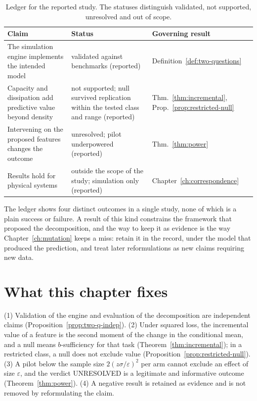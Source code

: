 \begin{table}[ht]
\centering
\small
\begin{tabular}{@{}p{4.1cm}p{4.0cm}p{4.0cm}@{}}
\toprule
Claim & Status & Governing result\\
\midrule
The simulation engine implements the intended model & validated against benchmarks (reported) & Definition~\ref{def:two-questions}\\
Capacity and dissipation add predictive value beyond density & not supported; null survived replication within the tested class and range (reported) & Thm.~\ref{thm:incremental}, Prop.~\ref{prop:restricted-null}\\
Intervening on the proposed features changes the outcome & unresolved; pilot underpowered (reported) & Thm.~\ref{thm:power}\\
Results hold for physical systems & outside the scope of the study; simulation only (reported) & Chapter~\ref{ch:correspondence}\\
\bottomrule
\end{tabular}
\caption{Ledger for the reported study. The statuses distinguish validated, not supported, unresolved and out of scope.}
\label{tab:negative-ledger}
\end{table}

The ledger shows four distinct outcomes in a single study, none of which is a plain success or failure. A result of this kind constrains the framework that proposed the decomposition, and the way to keep it as evidence is the way Chapter~\ref{ch:mutation} keeps a miss: retain it in the record, under the model that produced the prediction, and treat later reformulations as new claims requiring new data.

\section{What this chapter fixes}

\begin{principal}
(1) Validation of the engine and evaluation of the decomposition are independent claims (Proposition~\ref{prop:two-q-indep}). (2) Under squared loss, the incremental value of a feature is the second moment of the change in the conditional mean, and a null means $b$-sufficiency for that task (Theorem~\ref{thm:incremental}); in a restricted class, a null does not exclude value (Proposition~\ref{prop:restricted-null}). (3) A pilot below the sample size $2(z\sigma/\varepsilon)^2$ per arm cannot exclude an effect of size $\varepsilon$, and the verdict \textsf{UNRESOLVED} is a legitimate and informative outcome (Theorem~\ref{thm:power}). (4) A negative result is retained as evidence and is not removed by reformulating the claim.
\end{principal}

